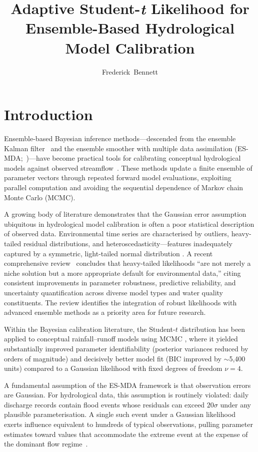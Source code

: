 \documentclass[article,nojss]{jss}
\title{Adaptive Student-\emph{t} Likelihood for Ensemble-Based
       Hydrological Model Calibration}
\author{Frederick~Bennett}
\begin{document}
\section{Introduction}

Ensemble-based Bayesian inference methods---descended from the ensemble
Kalman filter~\cite{Evensen2003} and the ensemble smoother with multiple
data assimilation (ES-MDA;~\cite{Emerick2013})---have become practical
tools for calibrating conceptual hydrological models against observed
streamflow~\cite{Botha2023,Bennett2026}.
These methods update a finite ensemble of parameter vectors through
repeated forward model evaluations, exploiting parallel computation and
avoiding the sequential dependence of Markov chain Monte Carlo (MCMC).

A growing body of literature demonstrates that the Gaussian error
assumption ubiquitous in hydrological model calibration is often a poor
statistical description of observed data.
Environmental time series are characterised by outliers, heavy-tailed
residual distributions, and heteroscedasticity---features inadequately
captured by a symmetric, light-tailed normal distribution
\cite{Schoups2010,Smith2022,Marshall2006}.
A recent comprehensive review~\cite{Review2025} concludes that
heavy-tailed likelihoods ``are not merely a niche solution but a more
appropriate default for environmental data,'' citing consistent
improvements in parameter robustness, predictive reliability, and
uncertainty quantification across diverse model types and water quality
constituents.
The review identifies the integration of robust likelihoods with advanced
ensemble methods as a priority area for future research.

Within the Bayesian calibration literature, the Student-$t$ distribution
has been applied to conceptual rainfall--runoff models using MCMC
\cite{Marshall2006}, where it yielded substantially improved parameter
identifiability (posterior variances reduced by orders of magnitude) and
decisively better model fit (BIC improved by $\sim$5,400 units) compared
to a Gaussian likelihood with fixed degrees of freedom $\nu = 4$.

A fundamental assumption of the ES-MDA framework is that observation
errors are Gaussian.
For hydrological data, this assumption is routinely violated: daily
discharge records contain flood events whose residuals can exceed
$20\sigma$ under any plausible parameterisation.
A single such event under a Gaussian likelihood exerts influence equivalent
to hundreds of typical observations, pulling parameter estimates toward
values that accommodate the extreme event at the expense of the dominant
flow regime~\cite{Schoups2010,Smith2022}.
\end{document}
